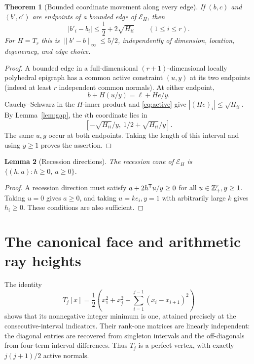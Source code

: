 \documentclass[11pt]{article}
\newtheorem{theorem}{Theorem}[section]
\newtheorem{lemma}[theorem]{Lemma}
\theoremstyle{remark}\newtheorem{remark}[theorem]{Remark}
\newcommand{\norm}[1]{\lVert #1\rVert}
\begin{document}
\begin{theorem}[Bounded coordinate movement along every edge]\label{thm:movement}
If $(b,c)$ and $(b',c')$ are endpoints of a bounded edge of $\mathcal E_H$, then
\begin{equation}\label{eq:movement}
 |b'_i-b_i|\le\frac12+2\sqrt{H_{ii}}\qquad(1\le i\le r).
\end{equation}
For $H=T_r$ this is $\norm{b'-b}_\infty\le5/2$, independently of dimension, location, degeneracy, and edge choice.
\end{theorem}
\begin{proof}
A bounded edge in a full-dimensional $(r+1)$-dimensional locally polyhedral epigraph has a common active constraint $(u,y)$ at its two endpoints (indeed at least $r$ independent common normals). At either endpoint,
\[
 b+H(u/y)=\ell+He/y.
\]
Cauchy--Schwarz in the $H$-inner product and \eqref{eq:active} give $|(He)_i|\le\sqrt{H_{ii}}$. By Lemma~\ref{lem:gap}, the $i$th coordinate lies in
\[
 [-\sqrt{H_{ii}}/y,\ 1/2+\sqrt{H_{ii}}/y].
\]
The same $u,y$ occur at both endpoints. Taking the length of this interval and using $y\ge1$ proves the assertion.
\end{proof}

\begin{lemma}[Recession directions]\label{lem:recession}
The recession cone of $\mathcal E_H$ is $\{(h,a):h\ge0,\ a\ge0\}$.
\end{lemma}
\begin{proof}
A recession direction must satisfy $a+2h^{\mathsf T} u/y\ge0$ for all $u\in\mathbb Z_+^r,y\ge1$. Taking $u=0$ gives $a\ge0$, and taking $u=ke_i,y=1$ with arbitrarily large $k$ gives $h_i\ge0$. These conditions are also sufficient.
\end{proof}

\section{The canonical face and arithmetic ray heights}
The identity
\begin{equation}\label{eq:root}
 T_j[x]=\frac12\left(x_1^2+x_j^2+\sum_{i=1}^{j-1}(x_i-x_{i+1})^2\right)
\end{equation}
shows that its nonnegative integer minimum is one, attained precisely at the consecutive-interval indicators. Their rank-one matrices are linearly independent: the diagonal entries are recovered from singleton intervals and the off-diagonals from four-term interval differences. Thus $T_j$ is a perfect vertex, with exactly $j(j+1)/2$ active normals.
\end{document}
